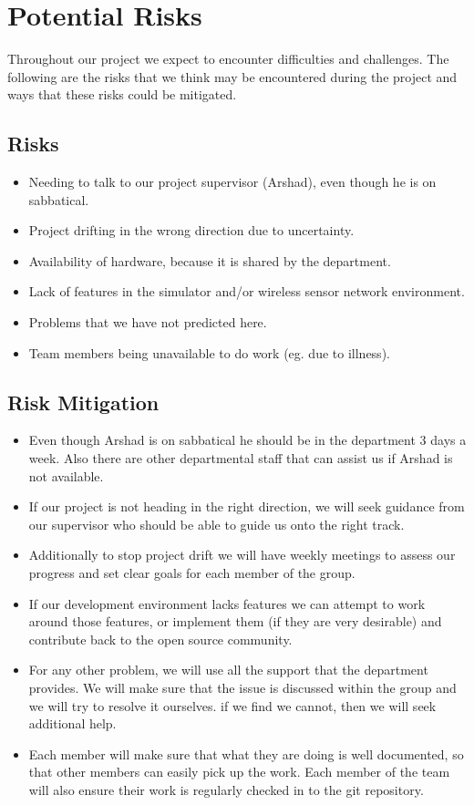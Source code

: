\documentclass[a4paper]{article}
\begin{document}
\section{Potential Risks}

Throughout our project we expect to encounter difficulties and challenges. The following are the risks that we think may be encountered during the project and ways that these risks could be mitigated.


\subsection{Risks}
\begin{itemize}
	\item Needing to talk to our project supervisor (Arshad), even though he is on sabbatical.
	\item Project drifting in the wrong direction due to uncertainty.
	\item Availability of hardware, because it is shared by the department.
	\item Lack of features in the simulator and/or wireless sensor network environment.
	\item Problems that we have not predicted here.
	\item Team members being unavailable to do work (eg. due to illness).
\end{itemize}

\subsection{Risk Mitigation}
\begin{itemize}
	\item Even though Arshad is on sabbatical he should be in the department 3 days a week. Also there are other departmental staff that can assist us if Arshad is not available.
	\item If our project is not heading in the right direction, we will seek guidance from our supervisor who should be able to guide us onto the right track.
	\item Additionally to stop project drift we will have weekly meetings to assess our progress and set clear goals for each member of the group.
	\item If our development environment lacks features we can attempt to work around those features, or implement them (if they are very desirable) and contribute back to the open source community.
	\item For any other problem, we will use all the support that the department provides. We will make sure that the issue is discussed within the group and we will try to resolve it ourselves. if we find we cannot, then we will seek additional help.
	\item Each member will make sure that what they are doing is well documented, so that other members can easily pick up the work. Each member of the team will also ensure their work is regularly checked in to the git repository.
\end{itemize}
\end{document}
